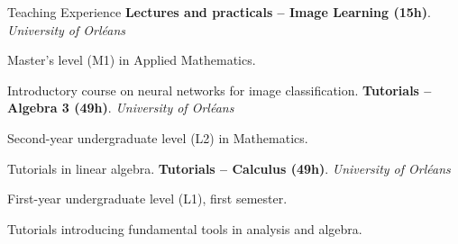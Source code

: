 \begin{rubric}{Teaching Experience}
\entry*[2022 -- 2025]%
\textbf{Lectures and practicals – Image Learning (15h)}. \emph{University of Orléans}
\par Master’s level (M1) in Applied Mathematics.
\par Introductory course on neural networks for image classification.
%
\entry*[2023 -- 2025]%
\textbf{Tutorials – Algebra 3 (49h)}. \emph{University of Orléans}
\par Second-year undergraduate level (L2) in Mathematics.
\par Tutorials in linear algebra.
%
\entry*[2022 -- 2023]%
\textbf{Tutorials – Calculus (49h)}. \emph{University of Orléans}
\par First-year undergraduate level (L1), first semester.
\par Tutorials introducing fundamental tools in analysis and algebra.
\end{rubric}